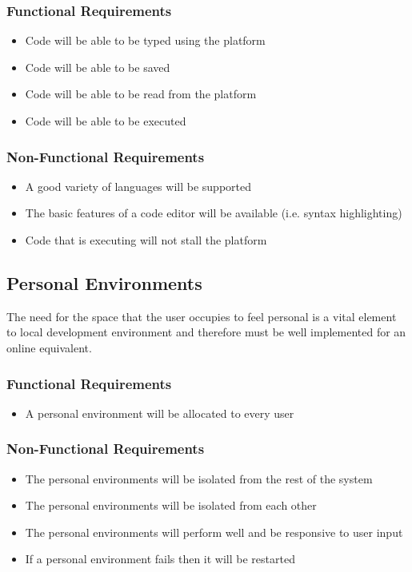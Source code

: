 \subsubsection{Functional Requirements}
\begin{itemize}
    \item Code will be able to be typed using the platform
    \item Code will be able to be saved
    \item Code will be able to be read from the platform
    \item Code will be able to be executed
\end{itemize}
\subsubsection{Non-Functional Requirements}
\begin{itemize}
    \item A good variety of languages will be supported
    \item The basic features of a code editor will be available (i.e. syntax highlighting)
    \item Code that is executing will not stall the platform
\end{itemize}

\subsection{Personal Environments}
The need for the space that the user occupies to feel personal is a vital element to local development environment and therefore must be well implemented for an online equivalent.

\subsubsection{Functional Requirements}
\begin{itemize}
    \item A personal environment will be allocated to every user
\end{itemize}
\subsubsection{Non-Functional Requirements}
\begin{itemize}
    \item The personal environments will be isolated from the rest of the system
    \item The personal environments will be isolated from each other
    \item The personal environments will perform well and be responsive to user input
    \item If a personal environment fails then it will be restarted
\end{itemize}

